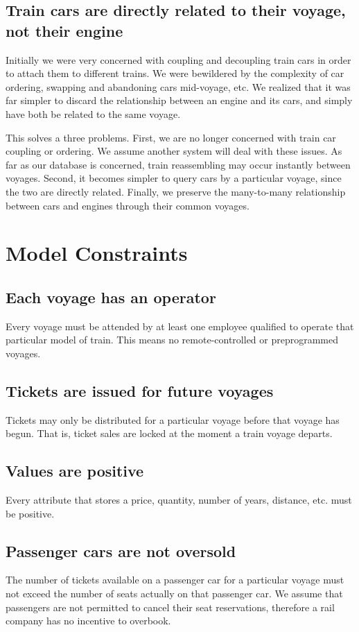 \documentclass[a4paper]{article}
\begin{document}
\subsection*{Train cars are directly related to their voyage, not their engine}
Initially we were very concerned with coupling and decoupling train cars in order to attach them to different trains. We were bewildered by the complexity of car ordering, swapping and abandoning cars mid-voyage, etc. We realized that it was far simpler to discard the relationship between an engine and its cars, and simply have both be related to the same voyage.

This solves a three problems. First, we are no longer concerned with train car coupling or ordering. We assume another system will deal with these issues. As far as our database is concerned, train reassembling may occur instantly between voyages. Second, it becomes simpler to query cars by a particular voyage, since the two are directly related. Finally, we preserve the many-to-many relationship between cars and engines through their common voyages.


\section{Model Constraints}
\subsection*{Each voyage has an operator}
Every voyage must be attended by at least one employee qualified to operate that particular model of train. This means no remote-controlled or preprogrammed voyages.

\subsection*{Tickets are issued for future voyages}
Tickets may only be distributed for a particular voyage before that voyage has begun. That is, ticket sales are locked at the moment a train voyage departs.

\subsection*{Values are positive}
Every attribute that stores a price, quantity, number of years, distance, etc. must be positive.

\subsection*{Passenger cars are not oversold}
The number of tickets available on a passenger car for a particular voyage must not exceed the number of seats actually on that passenger car. We assume that passengers are not permitted to cancel their seat reservations, therefore a rail company has no incentive to overbook.
\end{document}
